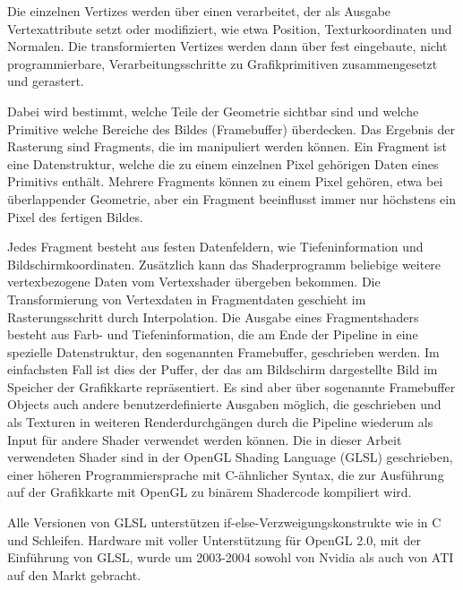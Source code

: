 Die einzelnen Vertizes werden über einen 
verarbeitet, der als Ausgabe Vertexattribute setzt oder modifiziert,
wie etwa Position, Texturkoordinaten und Normalen. Die transformierten
Vertizes werden dann über fest eingebaute, \Pimiddydh nicht
programmierbare, Verarbeitungsschritte zu Grafikprimitiven
zusammengesetzt und gerastert.

Dabei wird bestimmt, welche Teile der Geometrie sichtbar sind und
welche Primitive welche Bereiche des Bildes (\PimiddyzB Framebuffer)
überdecken. Das Ergebnis der Rasterung sind Fragments, die im
 manipuliert werden können. Ein
Fragment ist eine Datenstruktur, welche die zu einem einzelnen Pixel
gehörigen Daten eines Primitivs enthält. Mehrere Fragments können zu
einem Pixel gehören, etwa bei überlappender Geometrie, aber ein
Fragment beeinflusst immer nur höchstens ein Pixel des fertigen
Bildes.

Jedes Fragment besteht aus festen Datenfeldern, wie Tiefeninformation
und Bildschirmkoordinaten. Zusätzlich kann das Shaderprogramm
beliebige weitere vertexbezogene Daten vom Vertexshader übergeben
bekommen. Die Transformierung von Vertexdaten in Fragmentdaten
geschieht im Rasterungsschritt durch Interpolation. Die Ausgabe eines
Fragmentshaders besteht aus Farb- und Tiefeninformation, die am Ende
der Pipeline in eine spezielle Datenstruktur, den sogenannten
Framebuffer, geschrieben werden. Im einfachsten Fall ist dies der
Puffer, der das am Bildschirm dargestellte Bild im Speicher der
Grafikkarte repräsentiert. Es sind aber über sogenannte Framebuffer
Objects auch andere benutzerdefinierte Ausgaben möglich, die
geschrieben und \PimiddyzB als Texturen in weiteren Renderdurchgängen
durch die Pipeline wiederum als Input für andere Shader verwendet
werden können.  Die in dieser Arbeit verwendeten Shader sind in der
OpenGL Shading Language (GLSL) geschrieben, einer höheren
Programmiersprache mit C-ähnlicher Syntax, die zur Ausführung auf der
Grafikkarte mit OpenGL zu binärem Shadercode kompiliert wird.

Alle Versionen von GLSL unterstützen if-else-Verzweigungskonstrukte
wie in C und Schleifen.  Hardware mit voller Unterstützung für OpenGL
2.0, mit der Einführung von GLSL, wurde um 2003-2004 sowohl von Nvidia
als auch von ATI auf den Markt gebracht.
